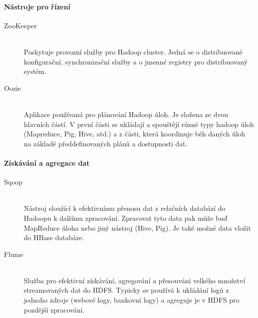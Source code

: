 \documentclass[thesis=M,czech]{FITthesis}[2012/06/26]
\begin{document}
\paragraph{Nástroje pro řízení}
\begin{description}
\item[ZooKeeper] \hfill \\
Poskytuje provozní služby pro Hadoop cluster. Jedná se o distribuované konfigurační, synchronizační služby a o jmenné registry pro distribuovaný systém. 

\item[Oozie] \hfill \\
Aplikace používaná pro plánování Hadoop úloh. Je složena ze dvou hlavních částí. V první části se ukládají a spouštějí různé typy hadoop úloh (Mapreduce, Pig, Hive, atd.) a z části, která koordinuje běh daných úloh na základě předdefinovaných plánů a dostupnosti dat.
\end{description}

\paragraph{Získávání a agregace dat}
\begin{description}
\item[Sqoop] \hfill \\
Nástroj sloužící k efektivnímu přenosu dat z relačních databází do Hadoopu k dalšímu zpracování. Zpracovat tyto data pak může buď MapReduce úloha nebo jiný nástroj (Hive, Pig). Je také možné data vložit do HBase databáze.
\item[Flume] \hfill \\
Služba pro efektivní získávání, agregování a přesouvání velkého množství streamovaných dat do HDFS. Typicky se používá k ukládání logů z jednoho zdroje (webové logy, bankovní logy) a agreguje je v HDFS pro pozdější zpracování.
\end{description}
\end{document}
